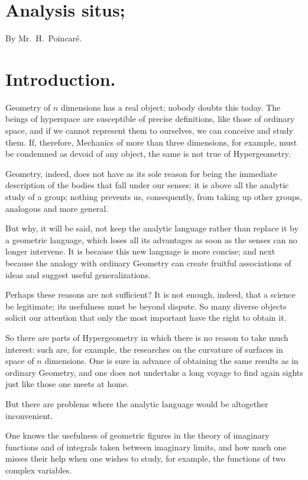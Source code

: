 \documentclass{article}
\begin{document}

\section*{Analysis situs;}

By Mr.~H.~Poincaré.

\section*{Introduction.}

Geometry of $n$ dimensions has a real object; nobody doubts this today. The beings of hyperspace are susceptible of precise definitions, like those of ordinary space, and if we cannot represent them to ourselves, we can conceive and study them. If, therefore, Mechanics of more than three dimensions, for example, must be condemned as devoid of any object, the same is not true of Hypergeometry.

Geometry, indeed, does not have as its sole reason for being the immediate description of the bodies that fall under our senses: it is above all the analytic study of a group; nothing prevents us, consequently, from taking up other groups, analogous and more general.

But why, it will be said, not keep the analytic language rather than replace it by a geometric language, which loses all its advantages as soon as the senses can no longer intervene. It is because this new language is more concise; and next because the analogy with ordinary Geometry can create fruitful associations of ideas and suggest useful generalizations.

Perhaps these reasons are not sufficient? It is not enough, indeed, that a science be legitimate: its usefulness must be beyond dispute. So many diverse objects solicit our attention that only the most important have the right to obtain it.

So there are parts of Hypergeometry in which there is no reason to take much interest: such are, for example, the researches on the curvature of surfaces in space of $n$ dimensions. One is sure in advance of obtaining the same results as in ordinary Geometry, and one does not undertake a long voyage to find again sights just like those one meets at home.

But there are problems where the analytic language would be altogether inconvenient.

One knows the usefulness of geometric figures in the theory of imaginary functions and of integrals taken between imaginary limits, and how much one misses their help when one wishes to study, for example, the functions of two complex variables.
\end{document}

